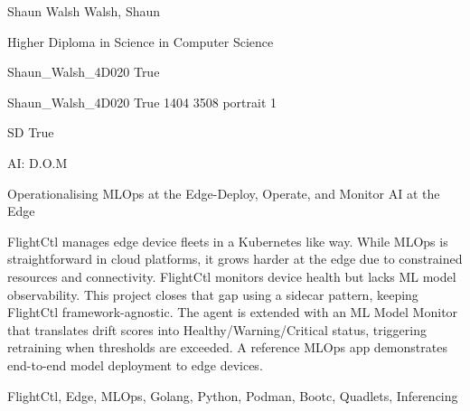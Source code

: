 \documentclass[twoside]{report}
\begin{document}
\begingroup{}\relax



\def\Key{Shaun_Walsh_4D020}

{Shaun Walsh}
{Walsh, Shaun}

{Higher Diploma in Science in Computer Science}

{Shaun_Walsh_4D020}
{True}

{Shaun_Walsh_4D020}
{True}
{1404}
{3508}
{portrait}
{1}

{SD}
{True}

{AI: D.O.M}

{Operationalising MLOps at the Edge-Deploy, Operate, and Monitor AI at the Edge}

{FlightCtl manages edge device fleets in a Kubernetes like way. While MLOps is straightforward in cloud platforms, it grows harder at the edge due to constrained resources and connectivity. FlightCtl monitors device health but lacks ML model observability. This project closes that gap using a sidecar pattern, keeping FlightCtl framework-agnostic. The agent is extended with an ML Model Monitor that translates drift scores into Healthy/Warning/Critical status, triggering retraining when thresholds are exceeded. A reference MLOps app demonstrates end-to-end model deployment to edge devices.}

{FlightCtl, Edge, MLOps, Golang, Python, Podman, Bootc, Quadlets, Inferencing}
\end{document}
